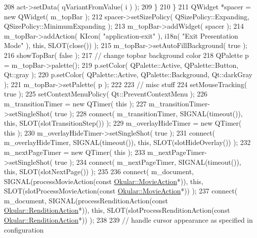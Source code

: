 \begin{DoxyCode}
{       %
208             act->setData( qVariantFromValue( i ) );
209         \}
210     \}
211     QWidget *spacer = \textcolor{keyword}{new} QWidget( m\_topBar );
212     spacer->setSizePolicy( QSizePolicy::Expanding, QSizePolicy::MinimumExpanding );
213     m\_topBar->addWidget( spacer );
214     m\_topBar->addAction( KIcon( \textcolor{stringliteral}{"application-exit"} ), i18n( \textcolor{stringliteral}{"Exit Presentation Mode"} ), \textcolor{keyword}{this}, SLOT(close())
       );
215     m\_topBar->setAutoFillBackground( \textcolor{keyword}{true} );
216     showTopBar( \textcolor{keyword}{false} );
217     \textcolor{comment}{// change topbar background color}
218     QPalette p = m\_topBar->palette();
219     p.setColor( QPalette::Active, QPalette::Button, Qt::gray );
220     p.setColor( QPalette::Active, QPalette::Background, Qt::darkGray );
221     m\_topBar->setPalette( p );
222 
223     \textcolor{comment}{// misc stuff}
224     setMouseTracking( \textcolor{keyword}{true} );
225     setContextMenuPolicy( Qt::PreventContextMenu );
226     m\_transitionTimer = \textcolor{keyword}{new} QTimer( \textcolor{keyword}{this} );
227     m\_transitionTimer->setSingleShot( \textcolor{keyword}{true} );
228     connect( m\_transitionTimer, SIGNAL(timeout()), \textcolor{keyword}{this}, SLOT(slotTransitionStep()) );
229     m\_overlayHideTimer = \textcolor{keyword}{new} QTimer( \textcolor{keyword}{this} );
230     m\_overlayHideTimer->setSingleShot( \textcolor{keyword}{true} );
231     connect( m\_overlayHideTimer, SIGNAL(timeout()), \textcolor{keyword}{this}, SLOT(slotHideOverlay()) );
232     m\_nextPageTimer = \textcolor{keyword}{new} QTimer( \textcolor{keyword}{this} ); 
233     m\_nextPageTimer->setSingleShot( \textcolor{keyword}{true} );
234     connect( m\_nextPageTimer, SIGNAL(timeout()), \textcolor{keyword}{this}, SLOT(slotNextPage()) ); 
235 
236     connect( m\_document, SIGNAL(processMovieAction(\textcolor{keyword}{const} \hyperlink{classOkular_1_1MovieAction}{Okular::MovieAction}*)), \textcolor{keyword}{this}, 
      SLOT(slotProcessMovieAction(\textcolor{keyword}{const} \hyperlink{classOkular_1_1MovieAction}{Okular::MovieAction}*)) );
237     connect( m\_document, SIGNAL(processRenditionAction(\textcolor{keyword}{const} 
      \hyperlink{classOkular_1_1RenditionAction}{Okular::RenditionAction}*)), \textcolor{keyword}{this}, SLOT(slotProcessRenditionAction(\textcolor{keyword}{const} 
      \hyperlink{classOkular_1_1RenditionAction}{Okular::RenditionAction}*)) );
238 
239     \textcolor{comment}{// handle cursor appearance as specified in configuration}
}
\end{DoxyCode}
